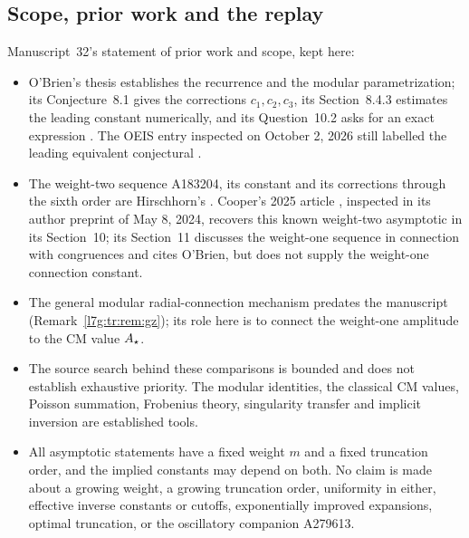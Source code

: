 \documentclass[11pt,letterpaper]{article}
\theoremstyle{remark}\newtheorem{remark}[theorem]{Remark}
\newcounter{l7gtrsavedeq}
\begin{document}
\subsection{Scope, prior work and the replay}\label{l7g:tr:sec:scope}
Manuscript~32's statement of prior work and scope, kept here:
\begin{itemize}[leftmargin=2em]
\item O'Brien's thesis establishes the recurrence and the modular
parametrization; its Conjecture~8.1 gives the corrections $c_1,c_2,c_3$,
its Section~8.4.3 estimates the leading constant numerically, and its
Question~10.2 asks for an exact expression \cite{l7g:obrien}. The OEIS
entry inspected on October 2, 2026 still labelled the leading equivalent
conjectural \cite{l7g:oeis279619}.
\item The weight-two sequence A183204, its constant and its corrections
through the sixth order are Hirschhorn's \cite{l7g:hirschhorn}. Cooper's
2025 article \cite{l7g:tr:cooper25}, inspected in its author preprint of
May 8, 2024, recovers this known weight-two asymptotic in its Section~10;
its Section~11 discusses the weight-one sequence in connection with
congruences and cites O'Brien, but does not supply the weight-one
connection constant.
\item The general modular radial-connection mechanism predates the
manuscript (Remark~\ref{l7g:tr:rem:gz}); its role here is to connect the
weight-one amplitude to the CM value $A_\star$.
\item The source search behind these comparisons is bounded and does not
establish exhaustive priority. The modular identities, the classical CM
values, Poisson summation, Frobenius theory, singularity transfer and
implicit inversion are established tools.
\item All asymptotic statements have a fixed weight $m$ and a fixed
truncation order, and the implied constants may depend on both. No claim
is made about a growing weight, a growing truncation order, uniformity in
either, effective inverse constants or cutoffs, exponentially improved
expansions, optimal truncation, or the oscillatory companion A279613.
\end{itemize}
\end{document}
